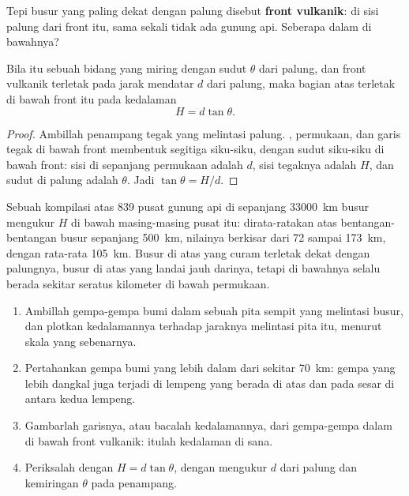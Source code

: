Tepi busur yang paling dekat dengan palung disebut \textbf{front vulkanik}: di
sisi palung dari front itu, sama sekali tidak ada gunung api. Seberapa dalam
 di bawahnya?

\begin{proposition}\label{prop:g12:subduction-magmatism:depth}
Bila  itu sebuah bidang yang miring dengan sudut $\theta$ dari palung,
dan front vulkanik terletak pada jarak mendatar $d$ dari palung, maka bagian
atas  terletak di bawah front itu pada kedalaman
\[
  H = d \tan\theta .
\]
\end{proposition}

\begin{proof}
Ambillah penampang tegak yang melintasi palung. , permukaan, dan garis
tegak di bawah front membentuk segitiga siku-siku, dengan sudut siku-siku di
bawah front: sisi di sepanjang permukaan adalah $d$, sisi tegaknya adalah
$H$, dan sudut di palung adalah $\theta$. Jadi $\tan\theta = H/d$.
\end{proof}

Sebuah kompilasi atas 839 pusat gunung api di sepanjang \qty{33000}{km} busur
mengukur $H$ di bawah masing-masing pusat itu: dirata-ratakan atas
bentangan-bentangan busur sepanjang \qty{500}{km}, nilainya berkisar dari 72
sampai \qty{173}{km}, dengan rata-rata \qty{105}{km}. Busur di atas 
yang curam terletak dekat dengan palungnya, busur di atas  yang landai
jauh darinya, tetapi  di bawahnya selalu berada sekitar seratus
kilometer di bawah permukaan.

\begin{method}\label{met:g12:subduction-magmatism:slab}
\begin{enumerate}
  \item Ambillah gempa-gempa bumi dalam sebuah pita sempit yang melintasi
        busur, dan plotkan kedalamannya terhadap jaraknya melintasi pita itu,
        menurut skala yang sebenarnya.
  \item Pertahankan gempa bumi yang lebih dalam dari sekitar \qty{70}{km}:
        gempa yang lebih dangkal juga terjadi di lempeng yang berada di atas
        dan pada sesar di antara kedua lempeng.
  \item Gambarlah garisnya, atau bacalah kedalamannya, dari gempa-gempa dalam
        di bawah front vulkanik: itulah kedalaman  di sana.
  \item Periksalah dengan $H = d\tan\theta$, dengan mengukur $d$ dari palung
        dan kemiringan $\theta$ pada penampang.
\end{enumerate}
\end{method}

